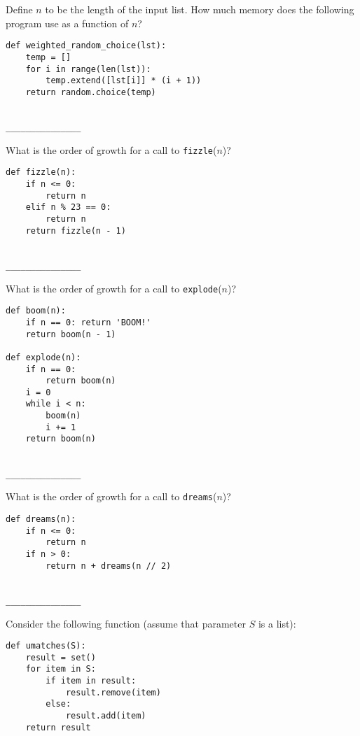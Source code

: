 \documentclass[twoside]{article}
\begin{document}
\begin{enumerate}

Define $n$ to be the length of the input list. How much memory does the following program use as a function of $n$?

\begin{lstlisting}
def weighted_random_choice(lst):
    temp = []
    for i in range(len(lst)):
        temp.extend([lst[i]] * (i + 1))
    return random.choice(temp)
\end{lstlisting}
~\\
\lstinline{_______________}


\begin{enumerate}
What is the order of growth for a call to \texttt{fizzle}($n$)?

\begin{lstlisting}
def fizzle(n):
    if n <= 0:
        return n
    elif n % 23 == 0:
        return n
    return fizzle(n - 1)
\end{lstlisting}
~\\
\lstinline{_______________}

What is the order of growth for a call to \texttt{explode}($n$)?

\begin{lstlisting}
def boom(n):
    if n == 0: return 'BOOM!'
    return boom(n - 1)

def explode(n):
    if n == 0:
        return boom(n)
    i = 0
    while i < n:
        boom(n)
        i += 1
    return boom(n)
\end{lstlisting}
~\\
\lstinline{_______________}

What is the order of growth for a call to \texttt{dreams}($n$)?

\begin{lstlisting}
def dreams(n):
    if n <= 0:
        return n
    if n > 0:
        return n + dreams(n // 2)
\end{lstlisting}
~\\
\lstinline{_______________}
\end{enumerate}


Consider the following function (assume that parameter $S$ is a list):

\begin{lstlisting}
def umatches(S):
    result = set()
    for item in S:
        if item in result:
            result.remove(item)
        else:
            result.add(item)
    return result
\end{lstlisting}


\end{enumerate}
\end{document}
